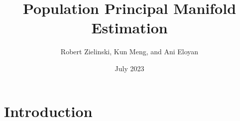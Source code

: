 \documentclass{article}
\title{Population Principal Manifold Estimation}
\author{Robert Zielinski, Kun Meng, and Ani Eloyan}
\date{July 2023}
\begin{document}
\maketitle

\section{Introduction}
\end{document}
